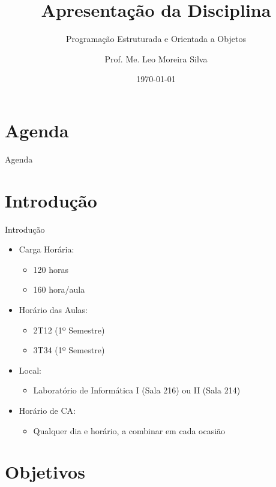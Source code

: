 \documentclass{beamer}
\title{Apresentação da Disciplina}
\subtitle{Programação Estruturada e Orientada a Objetos}
\author{Prof. Me. Leo Moreira Silva}
\date{\today}
\begin{document}
{ 
\frame{\titlepage}}

\section*{Agenda}\begin{frame}{Agenda}\tableofcontents\end{frame}

\section{Introdução}

\begin{frame}{Introdução}
    \begin{itemize}
        \item Carga Horária:
        \begin{itemize}
            \item 120 horas
            \item 160 hora/aula
        \end{itemize}
        \item Horário das Aulas:
        \begin{itemize}
            \item 2T12 (1º Semestre)
            \item 3T34 (1º Semestre)
        \end{itemize}
        \item Local:
        \begin{itemize}
            \item Laboratório de Informática I (Sala 216) ou II (Sala 214)
        \end{itemize}
        \item Horário de CA:
        \begin{itemize}
            \item Qualquer dia e horário, a combinar em cada ocasião
        \end{itemize}
    \end{itemize}
\end{frame}


\section{Objetivos}
\end{document}
